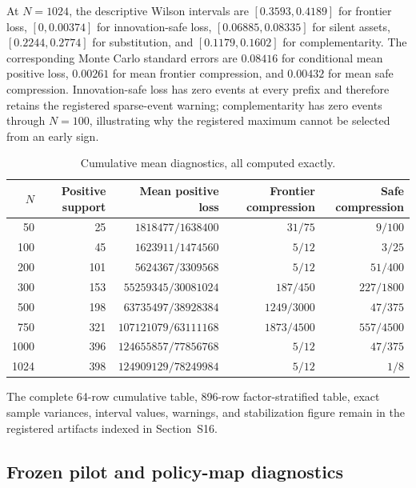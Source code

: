 At \(N=1024\), the descriptive Wilson intervals are
\([0.3593,0.4189]\) for frontier loss, \([0,0.00374]\) for innovation-safe
loss, \([0.06885,0.08335]\) for silent assets, \([0.2244,0.2774]\) for
substitution, and \([0.1179,0.1602]\) for complementarity.  The corresponding
Monte Carlo standard errors are \(0.08416\) for conditional mean positive
loss, \(0.00261\) for mean frontier compression, and \(0.00432\) for mean safe
compression.  Innovation-safe loss has zero events at every prefix and
therefore retains the registered sparse-event warning; complementarity has
zero events through \(N=100\), illustrating why the registered maximum cannot
be selected from an early sign.

\begin{table}[htbp]
\centering
\scriptsize
\setlength{\tabcolsep}{4pt}
\begin{tabular}{@{}rrrrr@{}}
\toprule
\(N\) & Positive support & Mean positive loss &
Frontier compression & Safe compression\\
\midrule
50   & 25  & \(1818477/1638400\)    & \(31/75\)     & \(9/100\)\\
100  & 45  & \(1623911/1474560\)    & \(5/12\)      & \(3/25\)\\
200  & 101 & \(5624367/3309568\)    & \(5/12\)      & \(51/400\)\\
300  & 153 & \(55259345/30081024\)  & \(187/450\)   & \(227/1800\)\\
500  & 198 & \(63735497/38928384\)  & \(1249/3000\) & \(47/375\)\\
750  & 321 & \(107121079/63111168\) & \(1873/4500\) & \(557/4500\)\\
1000 & 396 & \(124655857/77856768\) & \(5/12\)      & \(47/375\)\\
1024 & 398 & \(124909129/78249984\) & \(5/12\)      & \(1/8\)\\
\bottomrule
\end{tabular}
\caption{Cumulative mean diagnostics, all computed exactly.}
\label{tab:supp-randomized-v2-stability-means}
\end{table}

The complete 64-row cumulative table, 896-row factor-stratified table, exact
sample variances, interval values, warnings, and stabilization figure remain
in the registered artifacts indexed in Section~S16.

\subsection{Frozen pilot and policy-map diagnostics}

